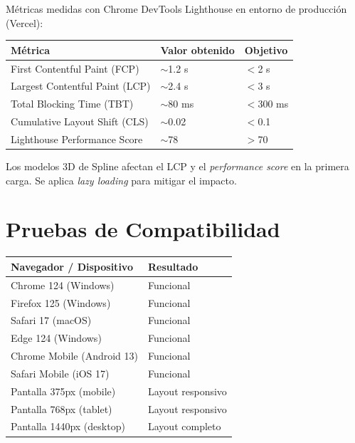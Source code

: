 \documentclass[12pt, a4paper, twoside]{report}
\newcommand{\cmark}{\textcolor{green!60!black}{\ding{51}}}
\begin{document}
Métricas medidas con Chrome DevTools Lighthouse en entorno de producción (Vercel):

\begin{center}
\begin{tabular}{L{5.5cm} C{3cm} C{2.5cm}}
  \toprule
  \textbf{Métrica} & \textbf{Valor obtenido} & \textbf{Objetivo} \\
  \midrule
  First Contentful Paint (FCP)     & $\sim$1.2 s & $<$2 s   \\
  Largest Contentful Paint (LCP)   & $\sim$2.4 s & $<$3 s   \\
  Total Blocking Time (TBT)        & $\sim$80 ms & $<$300 ms \\
  Cumulative Layout Shift (CLS)    & $\sim$0.02  & $<$0.1   \\
  Lighthouse Performance Score     & $\sim$78    & $>$70    \\
  \bottomrule
\end{tabular}
\end{center}

\begin{tcolorbox}[notebox]
  Los modelos 3D de Spline afectan el LCP y el \textit{performance score} en la primera carga.
  Se aplica \textit{lazy loading} para mitigar el impacto.
\end{tcolorbox}

\section{Pruebas de Compatibilidad}

\begin{center}
\begin{tabular}{L{6cm} C{3cm}}
  \toprule
  \textbf{Navegador / Dispositivo} & \textbf{Resultado} \\
  \midrule
  Chrome 124 (Windows)        & \cmark{} Funcional \\
  Firefox 125 (Windows)       & \cmark{} Funcional \\
  Safari 17 (macOS)           & \cmark{} Funcional \\
  Edge 124 (Windows)          & \cmark{} Funcional \\
  Chrome Mobile (Android 13)  & \cmark{} Funcional \\
  Safari Mobile (iOS 17)      & \cmark{} Funcional \\
  Pantalla 375px (mobile)     & \cmark{} Layout responsivo \\
  Pantalla 768px (tablet)     & \cmark{} Layout responsivo \\
  Pantalla 1440px (desktop)   & \cmark{} Layout completo \\
  \bottomrule
\end{tabular}
\end{center}
\end{document}
